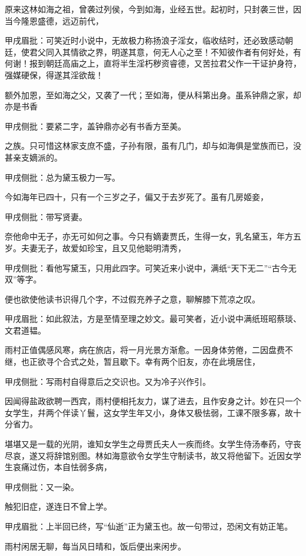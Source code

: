 \begin{parag}
    原来这林如海之祖，曾袭过列侯，今到如海，业经五世。起初时，只封袭三世，因当今隆恩盛德，远迈前代，\begin{note}甲戌眉批：可笑近时小说中，无故极力称扬浪子淫女，临收结时，还必致感动朝廷，使君父同入其情欲之界，明遂其意，何无人心之至！不知彼作者有何好处，有何谢！报到朝廷高庙之上，直将半生淫朽秽资睿德，又苦拉君父作一干证护身符，强媒硬保，得遂其淫欲哉！\end{note}额外加恩，至如海之父，又袭了一代；至如海，便从科第出身。虽系钟鼎之家，却亦是书香\begin{note}甲戌侧批：要紧二字，盖钟鼎亦必有书香方至美。\end{note}之族。只可惜这林家支庶不盛，子孙有限，虽有几门，却与如海俱是堂族而已，没甚亲支嫡派的。\begin{note}甲戌侧批：总为黛玉极力一写。\end{note}今如海年已四十，只有一个三岁之子，偏又于去岁死了。虽有几房姬妾，\begin{note}甲戌侧批：带写贤妻。\end{note}奈他命中无子，亦无可如何之事。今只有嫡妻贾氏，生得一女，乳名黛玉，年方五岁。夫妻无子，故爱如珍宝，且又见他聪明清秀，\begin{note}甲戌侧批：看他写黛玉，只用此四字。可笑近来小说中，满纸“天下无二”“古今无双”等字。\end{note}便也欲使他读书识得几个字，不过假充养子之意，聊解膝下荒凉之叹。\begin{note}甲戌眉批：如此叙法，方是至情至理之妙文。最可笑者，近小说中满纸班昭蔡琰、文君道韫。\end{note}
\end{parag}


\begin{parag}
    雨村正值偶感风寒，病在旅店，将一月光景方渐愈。一因身体劳倦，二因盘费不继，也正欲寻个合式之处，暂且歇下。幸有两个旧友，亦在此境居住，\begin{note}甲戌侧批：写雨村自得意后之交识也。又为冷子兴作引。\end{note}因闻得盐政欲聘一西宾，雨村便相托友力，谋了进去，且作安身之计。妙在只一个女学生，幷两个伴读丫鬟，这女学生年又小，身体又极怯弱，工课不限多寡，故十分省力。
\end{parag}


\begin{parag}
    堪堪又是一载的光阴，谁知女学生之母贾氏夫人一疾而终。女学生侍汤奉药，守丧尽哀，遂又将辞馆别图。林如海意欲令女学生守制读书，故又将他留下。近因女学生哀痛过伤，本自怯弱多病，\begin{note}甲戌侧批：又一染。\end{note}触犯旧症，遂连日不曾上学。\begin{note}甲戌眉批：上半回已终，写“仙逝”正为黛玉也。故一句带过，恐闲文有妨正笔。\end{note}雨村闲居无聊，每当风日晴和，饭后便出来闲步。
\end{parag}


